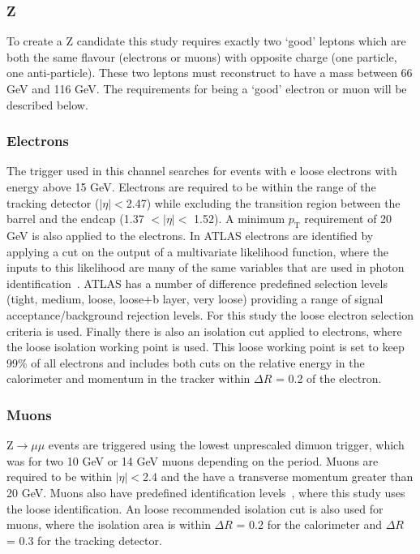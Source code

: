\subsubsection{Z}
To create a Z candidate this study requires exactly two `good' leptons which are both the same flavour (electrons or muons) with opposite charge (one particle, one anti-particle). 
These two leptons must reconstruct to have a mass between 66 GeV and 116 GeV.  
The requirements for being a `good' electron or muon will be described below.  

\subsubsection{Electrons}
The trigger used in this channel searches for events with e loose electrons with energy above 15 GeV.  
Electrons are required to be within the range of the tracking detector ($\mid\eta\mid<$2.47) while excluding the transition region between the barrel and the endcap (1.37 $<\mid\eta\mid<$ 1.52).  
A minimum $p_{\mathrm T}$ requirement of 20 GeV is also applied to the electrons.  
In ATLAS electrons are identified by applying a cut on the output of a multivariate likelihood function, where the inputs to this likelihood are many of the same variables that are used in photon identification~\cite{ATL-PHYS-PUB-2015-041}.  
ATLAS has a number of difference predefined selection levels (tight, medium, loose, loose+b layer, very loose) providing a range of signal acceptance/background rejection levels.  
For this study the loose electron selection criteria is used.  
Finally there is also an isolation cut applied to electrons, where the loose isolation working point is used.  
This loose working point is set to keep 99\% of all electrons and includes both cuts on the relative energy in the calorimeter and momentum in the tracker within $\Delta R$ = 0.2 of the electron.  


\subsubsection{Muons}
Z$\rightarrow\mu\mu$ events are triggered using the lowest unprescaled dimuon trigger, which was for two 10 GeV or 14 GeV muons depending on the period.   
Muons are required to be within $\mid\eta\mid<$2.4 and the have a transverse momentum greater than 20 GeV.  
Muons also have predefined identification levels~\cite{ATL-PHYS-PUB-2015-037}, where this study uses the loose identification.  
An loose recommended isolation cut is also used for muons, where the isolation area is within $\Delta R$ = 0.2 for the calorimeter and $\Delta R$ = 0.3 for the tracking detector.  

